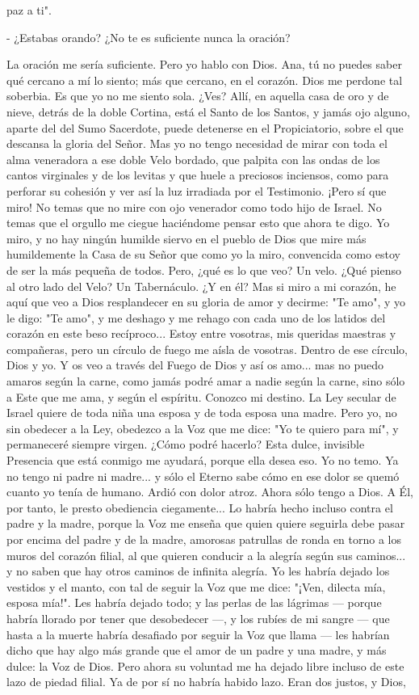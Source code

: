 \documentclass[12pt]{book} %
\begin{document}
paz a ti". 

- ¿Estabas orando? ¿No te es suficiente nunca la oración? 

La oración me sería suficiente. Pero yo hablo con Dios. Ana, tú no puedes saber qué cercano a mí lo siento; más que cercano, en el corazón. Dios me perdone tal soberbia. Es que yo no me siento sola. ¿Ves? Allí, en aquella casa de oro y de nieve, detrás de la doble Cortina, está el Santo de los Santos, y jamás ojo alguno, aparte del del Sumo Sacerdote, puede detenerse en el Propiciatorio, sobre el que descansa la gloria del Señor. Mas yo no tengo necesidad de mirar con toda el alma veneradora a ese doble Velo bordado, que palpita con las ondas de los cantos virginales y de los levitas y que huele a preciosos inciensos, como para perforar su cohesión y ver así la luz irradiada por el Testimonio. ¡Pero sí que miro! No temas que no mire con ojo venerador como todo hijo de Israel. No temas que el orgullo me ciegue haciéndome pensar esto que ahora te digo. Yo miro, y no hay ningún humilde siervo en el pueblo de Dios que mire más humildemente la Casa de su Señor que como yo la miro, convencida como estoy de ser la más pequeña de todos. Pero, ¿qué es lo que veo? Un velo. ¿Qué pienso al otro lado del Velo? Un Tabernáculo. ¿Y en él? Mas si miro a mi corazón, he aquí que veo a Dios resplandecer en su gloria de amor y decirme: "Te amo", y yo le digo: "Te amo", y me deshago y me rehago con cada uno de los latidos del corazón en este beso recíproco... Estoy entre vosotras, mis queridas maestras y compañeras, pero un círculo de fuego me aísla de vosotras. Dentro de ese círculo, Dios y yo. Y os veo a través del Fuego de Dios y así os amo... mas no puedo amaros según la carne, como jamás podré amar a nadie según la carne, sino sólo a Este que me ama, y según el espíritu. Conozco mi destino. La Ley secular de Israel quiere de toda niña una esposa y de toda esposa una madre. Pero yo, no sin obedecer a la Ley, obedezco a la Voz que me dice: "Yo te quiero para mí", y permaneceré siempre virgen. ¿Cómo podré hacerlo? Esta dulce, invisible Presencia que está conmigo me ayudará, porque ella desea eso. Yo no temo. Ya no tengo ni padre ni madre... y sólo el Eterno sabe cómo en ese dolor se quemó cuanto yo tenía de humano. Ardió con dolor atroz. Ahora sólo tengo a Dios. A Él, por tanto, le presto obediencia ciegamente... Lo habría hecho incluso contra el padre y la madre, porque la Voz me enseña que quien quiere seguirla debe pasar por encima del padre y de la madre, amorosas patrullas de ronda en torno a los muros del corazón filial, al que quieren conducir a la alegría según sus caminos... y no saben que hay otros caminos de infinita alegría. Yo les habría dejado los vestidos y el manto, con tal de seguir la Voz que me dice: "¡Ven, dilecta mía, esposa mía!". Les habría dejado todo; y las perlas de las lágrimas — porque habría llorado por tener que desobedecer —, y los rubíes de mi sangre — que hasta a la muerte habría desafiado por seguir la Voz que llama — les habrían dicho que hay algo más grande que el amor de un padre y una madre, y más dulce: la Voz de Dios. Pero ahora su voluntad me ha dejado libre incluso de este lazo de piedad filial. Ya de por sí no habría habido lazo. Eran dos justos, y Dios, 
\end{document}
